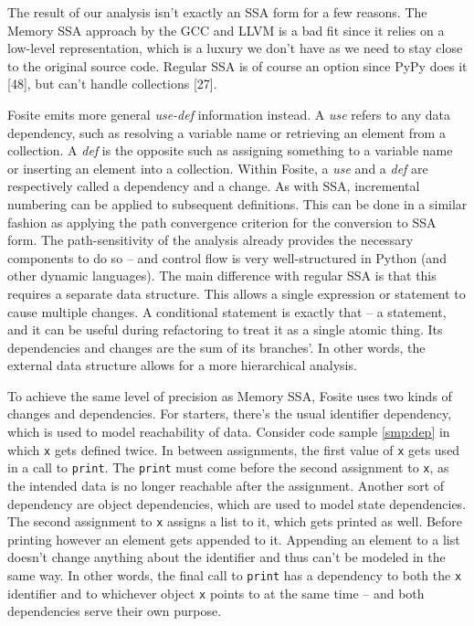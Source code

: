 \documentclass[a4paper, 16pt, oneside]{Thesis}
\begin{document}
The result of our analysis isn't exactly an SSA form for a few reasons.
The Memory SSA approach by the GCC and LLVM is a bad fit since it relies
on a low-level representation, which is a luxury we don't have as we
need to stay close to the original source code. Regular SSA is of course
an option since PyPy does it {[}48{]}, but can't handle collections
{[}27{]}.

Fosite emits more general \emph{use-def} information instead. A
\emph{use} refers to any data dependency, such as resolving a variable
name or retrieving an element from a collection. A \emph{def} is the
opposite such as assigning something to a variable name or inserting an
element into a collection. Within Fosite, a \emph{use} and a \emph{def}
are respectively called a dependency and a change. As with SSA,
incremental numbering can be applied to subsequent definitions. This can
be done in a similar fashion as applying the path convergence criterion
for the conversion to SSA form. The path-sensitivity of the analysis
already provides the necessary components to do so -- and control flow
is very well-structured in Python (and other dynamic languages). The
main difference with regular SSA is that this requires a separate data
structure. This allows a single expression or statement to cause
multiple changes. A conditional statement is exactly that -- a
statement, and it can be useful during refactoring to treat it as a
single atomic thing. Its dependencies and changes are the sum of its
branches'. In other words, the external data structure allows for a more
hierarchical analysis.

To achieve the same level of precision as Memory SSA, Fosite uses two
kinds of changes and dependencies. For starters, there's the usual
identifier dependency, which is used to model reachability of data.
Consider code sample \ref{smp:dep} in which \texttt{x} gets defined
twice. In between assignments, the first value of \texttt{x} gets used
in a call to \texttt{print}. The \texttt{print} must come before the
second assignment to \texttt{x}, as the intended data is no longer
reachable after the assignment. Another sort of dependency are object
dependencies, which are used to model state dependencies. The second
assignment to \texttt{x} assigns a list to it, which gets printed as
well. Before printing however an element gets appended to it. Appending
an element to a list doesn't change anything about the identifier and
thus can't be modeled in the same way. In other words, the final call to
\texttt{print} has a dependency to both the \texttt{x} identifier and to
whichever object \texttt{x} points to at the same time -- and both
dependencies serve their own purpose.
\end{document}
